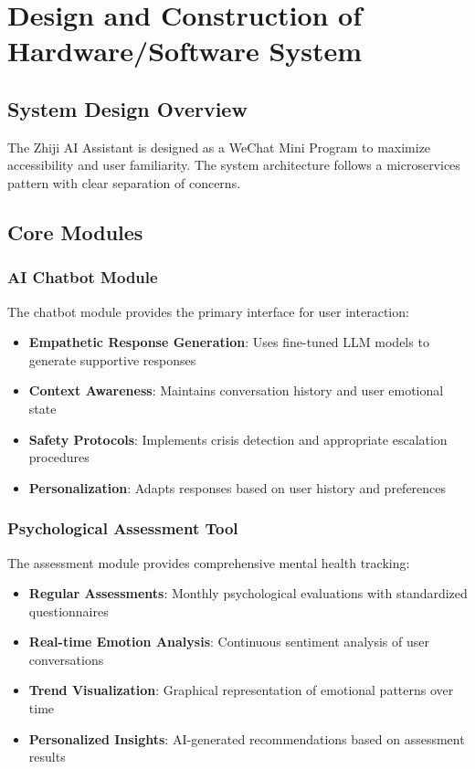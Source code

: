 \section{Design and Construction of Hardware/Software System}
\label{sec:design}

\subsection{System Design Overview}

The Zhiji AI Assistant is designed as a WeChat Mini Program to maximize accessibility and user familiarity. The system architecture follows a microservices pattern with clear separation of concerns.

\subsection{Core Modules}

\subsubsection{AI Chatbot Module}

The chatbot module provides the primary interface for user interaction:

\begin{itemize}
    \item \textbf{Empathetic Response Generation}: Uses fine-tuned LLM models to generate supportive responses
    \item \textbf{Context Awareness}: Maintains conversation history and user emotional state
    \item \textbf{Safety Protocols}: Implements crisis detection and appropriate escalation procedures
    \item \textbf{Personalization}: Adapts responses based on user history and preferences
\end{itemize}

\subsubsection{Psychological Assessment Tool}

The assessment module provides comprehensive mental health tracking:

\begin{itemize}
    \item \textbf{Regular Assessments}: Monthly psychological evaluations with standardized questionnaires
    \item \textbf{Real-time Emotion Analysis}: Continuous sentiment analysis of user conversations
    \item \textbf{Trend Visualization}: Graphical representation of emotional patterns over time
    \item \textbf{Personalized Insights}: AI-generated recommendations based on assessment results
\end{itemize}

